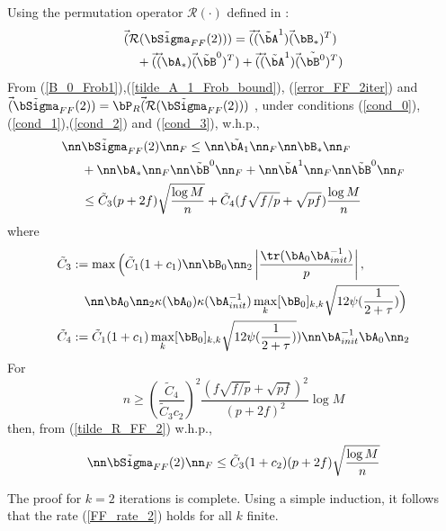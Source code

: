 \begin{IEEEproof}
Using the permutation operator $\mathcal{R}(\cdot)$ defined in \cite{EstCovMatKron}:
\begin{align}
	& \vec(\mathcal{R}(\tilde{\bSigma}_{FF}(2))) = \vec(\vec(\tilde{\bA}^1)\vec(\bB_*)^T) \nonumber \\
		&\quad + \vec(\vec(\bA_*)\vec(\tilde{\bB}^0)^T) + \vec(\vec(\tilde{\bA}^1)\vec(\tilde{\bB^0})^T) \label{error_FF_2iter}
\end{align}
From (\ref{B_0_Frob1}),(\ref{tilde_A_1_Frob_bound}), (\ref{error_FF_2iter}) and $\vec(\tilde{\bSigma}_{FF}(2)) = \bP_R \vec(\mathcal{R}(\tilde{\bSigma}_{FF}(2)))$ \cite{EstCovMatKron}, under conditions (\ref{cond_0}),(\ref{cond_1}),(\ref{cond_2}) and (\ref{cond_3}), w.h.p.,
\begin{align}
	\nn &\tilde{\bSigma}_{FF}(2) \nn_F \leq \nn \tilde{\bA_1} \nn_F \nn \bB_*\nn_F \nonumber \\
		&+ \nn \bA_*\nn_F \nn \tilde{\bB}^0 \nn_F + \nn \tilde{\bA}^1\nn_F \nn \tilde{\bB}^0\nn_F \nonumber \\
		&\leq \tilde{C}_3 (p+2f) \sqrt{\frac{\log M}{n}} + \tilde{C}_4 (f\sqrt{f/p}+\sqrt{pf}) \frac{\log M}{n} \label{tilde_R_FF_2}
\end{align}
where
\begin{align*}
	\tilde{C}_3 &:= \max \Big(\tilde{C}_1(1+c_1) \nn\bB_0\nn_2 \left|\frac{\tr(\bA_0\bA_{init}^{-1})}{p}\right|, \\
		&\quad \nn\bA_0\nn_2 \kappa(\bA_0)\kappa(\bA_{init}^{-1}) \max_k [\bB_0]_{k,k} \sqrt{12\psi(\frac{1}{2+\tau})} \Big) \\
	\tilde{C}_4 &:= \tilde{C}_1(1+c_1) \max_k [\bB_0]_{k,k} \sqrt{12\psi(\frac{1}{2+\tau})}) \nn\bA_{init}^{-1} \bA_0\nn_2
\end{align*}
For
\begin{equation} \label{cond_star_2}
	n \geq (\frac{\tilde{C}_4}{\tilde{C}_3 c_2})^2 \frac{(f\sqrt{f/p}+\sqrt{pf})^2}{(p+2f)^2} \log M
\end{equation}
then, from (\ref{tilde_R_FF_2}) w.h.p.,
\begin{equation*}
	\nn \tilde{\bSigma}_{FF}(2)\nn_F \leq \tilde{C}_3(1+c_2) (p+2f) \sqrt{\frac{\log M}{n}}
\end{equation*}

The proof for $k=2$ iterations is complete. Using a simple induction, it follows that the rate (\ref{FF_rate_2}) holds for all $k$ finite.



\end{IEEEproof}
